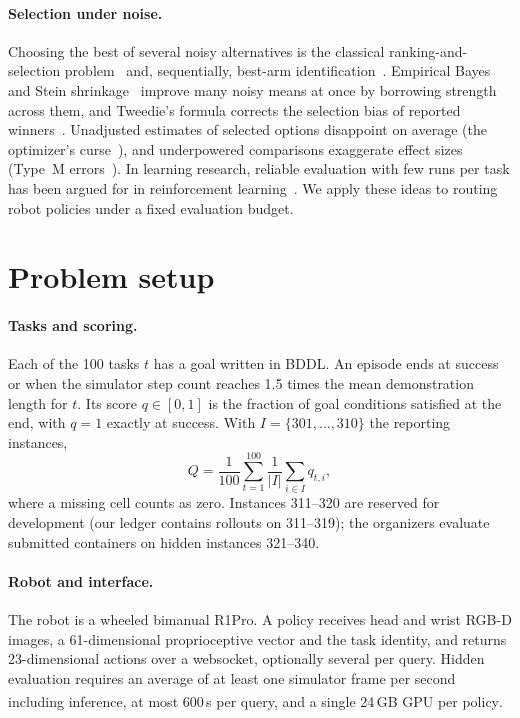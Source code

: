 \documentclass[10pt]{article}
\newcommand{\Q}{\ensuremath{Q}}
\newcommand{\pl}{\textsuperscript{\dag}}
\begin{document}
\paragraph{Selection under noise.} Choosing the best of several noisy alternatives is the classical ranking-and-selection problem~\cite{bechhofer1954} and, sequentially, best-arm identification~\cite{kaufmann2016bestarm}. Empirical Bayes and Stein shrinkage~\cite{efron1975stein} improve many noisy means at once by borrowing strength across them, and Tweedie's formula corrects the selection bias of reported winners~\cite{efron2011tweedie}. Unadjusted estimates of selected options disappoint on average (the optimizer's curse~\cite{smith2006optimizer}), and underpowered comparisons exaggerate effect sizes (Type~M errors~\cite{gelman2014typem}). In learning research, reliable evaluation with few runs per task has been argued for in reinforcement learning~\cite{agarwal2021precipice}. We apply these ideas to routing robot policies under a fixed evaluation budget.

\section{Problem setup}
\label{sec:setup}

\paragraph{Tasks and scoring.} Each of the 100 tasks $t$ has a goal written in BDDL. An episode ends at success or when the simulator step count reaches 1.5 times the mean demonstration length for $t$. Its score $q\in[0,1]$ is the fraction of goal conditions satisfied at the end, with $q=1$ exactly at success. With $I=\{301,\dots,310\}$ the reporting instances,
\begin{equation}
\Q=\frac{1}{100}\sum_{t=1}^{100}\frac{1}{|I|}\sum_{i\in I} q_{t,i},
\end{equation}
where a missing cell counts as zero. Instances 311--320 are reserved for development (our ledger contains rollouts on 311--319); the organizers evaluate submitted containers on hidden instances 321--340.

\paragraph{Robot and interface.} The robot is a wheeled bimanual R1Pro. A policy receives head and wrist RGB-D images, a 61-dimensional proprioceptive vector and the task identity, and returns 23-dimensional actions over a websocket, optionally several per query. Hidden evaluation requires an average of at least one simulator frame per second including inference, at most 600\,s per query, and a single 24\,GB GPU per policy\pl.
\end{document}

